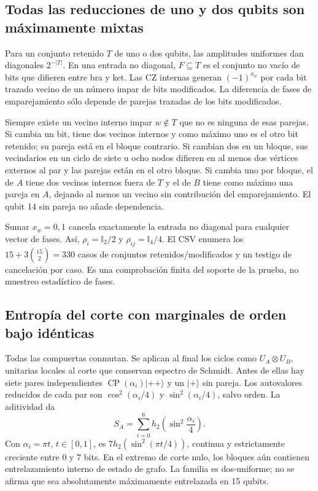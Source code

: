 \documentclass[11pt,a4paper]{article}
\begin{document}
\subsection{Todas las reducciones de uno y dos qubits son máximamente mixtas}
Para un conjunto retenido $T$ de uno o dos qubits, las amplitudes uniformes dan diagonales $2^{-|T|}$. En una entrada no diagonal, $F\subseteq T$ es el conjunto no vacío de bits que difieren entre bra y ket. Las CZ internas generan $(-1)^{x_w}$ por cada bit trazado vecino de un número impar de bits modificados. La diferencia de fases de emparejamiento sólo depende de parejas trazadas de los bits modificados.

Siempre existe un vecino interno impar $w\notin T$ que no es ninguna de esas parejas. Si cambia un bit, tiene dos vecinos internos y como máximo uno es el otro bit retenido; su pareja está en el bloque contrario. Si cambian dos en un bloque, sus vecindarios en un ciclo de siete u ocho nodos difieren en al menos dos vértices externos al par y las parejas están en el otro bloque. Si cambia uno por bloque, el de $A$ tiene dos vecinos internos fuera de $T$ y el de $B$ tiene como máximo una pareja en $A$, dejando al menos un vecino sin contribución del emparejamiento. El qubit 14 sin pareja no añade dependencia.

Sumar $x_w=0,1$ cancela exactamente la entrada no diagonal para cualquier vector de fases. Así, $\rho_i=\mathbb I_2/2$ y $\rho_{ij}=\mathbb I_4/4$. El CSV enumera los $15+3\binom{15}{2}=330$ casos de conjuntos retenidos/modificados y un testigo de cancelación por caso. Es una comprobación finita del soporte de la prueba, no muestreo estadístico de fases.

\subsection{Entropía del corte con marginales de orden bajo idénticas}
Todas las compuertas conmutan. Se aplican al final los ciclos como $U_A\otimes U_B$, unitarias locales al corte que conservan espectro de Schmidt. Antes de ellas hay siete pares independientes $\operatorname{CP}(\alpha_i)|++\rangle$ y un $|+\rangle$ sin pareja. Los autovalores reducidos de cada par son $\cos^2(\alpha_i/4)$ y $\sin^2(\alpha_i/4)$, salvo orden. La aditividad da
\[
S_A=\sum_{i=0}^{6}h_2\left(\sin^2\frac{\alpha_i}{4}\right).
\]
Con $\alpha_i=\pi t$, $t\in[0,1]$, es $7h_2(\sin^2(\pi t/4))$, continua y estrictamente creciente entre 0 y 7 bits. En el extremo de corte nulo, los bloques aún contienen entrelazamiento interno de estado de grafo. La familia es dos-uniforme; no se afirma que sea absolutamente máximamente entrelazada en 15 qubits.
\end{document}
